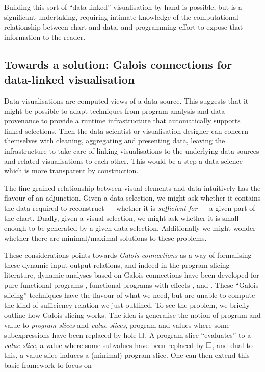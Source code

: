 Building this sort of ``data linked'' visualisation by hand is possible, but is a significant undertaking, requiring intimate knowledge of the computational relationship between chart and data, and programming effort to expose that information to the reader.



\subsection{Towards a solution: Galois connections for data-linked visualisation}

Data visualisations are computed views of a data source. This suggests that it might be possible to adapt techniques from program analysis and data provenance to provide a runtime infrastructure that automatically supports linked selections. Then the data scientist or visualisation designer can concern themselves with cleaning, aggregating and presenting data, leaving the infrastructure to take care of linking visualisations to the underlying data sources and related visualisations to each other. This would be a step a data science which is more transparent by construction.

The fine-grained relationship between visual elements and data intuitively has the flavour of an adjunction. Given a data selection, we might ask whether it contains the data required to reconstruct --- whether it is \emph{sufficient for} --- a given part of the chart. Dually, given a visual selection, we might ask whether it is small enough to be generated by a given data selection. Additionally we might wonder whether there are minimal/maximal solutions to these problems.

These considerations points towards \emph{Galois connections} as a way of formalising these dynamic input-output relations, and indeed in the program slicing literature, dynamic analyses based on Galois connections have been developed for pure functional programs \cite{perera12a}, functional programs with effects \cite{ricciotti17}, and \piCalculus \cite{perera16d}. These ``Galois slicing'' techniques have the flavour of what we need, but are unable to compute the kind of sufficiency relation we just outlined. To see the problem, we briefly outline how Galois slicing works. The idea is generalise the notion of program and value to \emph{program slices} and \emph{value slices}, program and values where some subexpressions have been replaced by hole $\square$. A program slice ``evaluates'' to a \emph{value slice}, a value where some subvalues have been replaced by $\square$, and dual to this, a value slice induces a (minimal) program slice. One can then extend this basic framework to focus on

